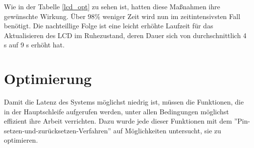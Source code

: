 Wie in der Tabelle \ref{lcd_opt} zu sehen ist, hatten diese Maßnahmen ihre gewünschte Wirkung. Über 98\% weniger Zeit
wird nun im zeitintensivsten Fall benötigt. Die nachteillige Folge ist eine leicht erhöhte Laufzeit für das
Aktualisieren des LCD im Ruhezustand, deren Dauer sich von durchschnittlich 4 \textmu{}s auf 9 \textmu{}s erhöht hat.

\section{Optimierung}
Damit die Latenz des Systems möglichst niedrig ist, müssen die Funktionen, die in der Hauptschleife aufgerufen werden,
unter allen Bedingungen möglichst effizient ihre Arbeit verrichten. Dazu wurde jede dieser Funktionen mit dem 
''Pin-setzen-und-zurücksetzen-Verfahren'' auf Möglichkeiten untersucht, sie zu optimieren.

